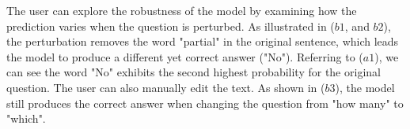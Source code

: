 The user can explore the robustness of the model by examining how the prediction varies when the question is perturbed.
%
As illustrated in ($b1$, and $b2$), the perturbation removes the word "partial" in the original sentence, which leads the model to produce a different yet correct answer ("No"). Referring to ($a1$), we can see the word "No" exhibits the second highest probability for the original question.
%
The user can also manually edit the text. As shown in ($b3$), the model still produces the correct answer when changing the question from "how many" to "which".

